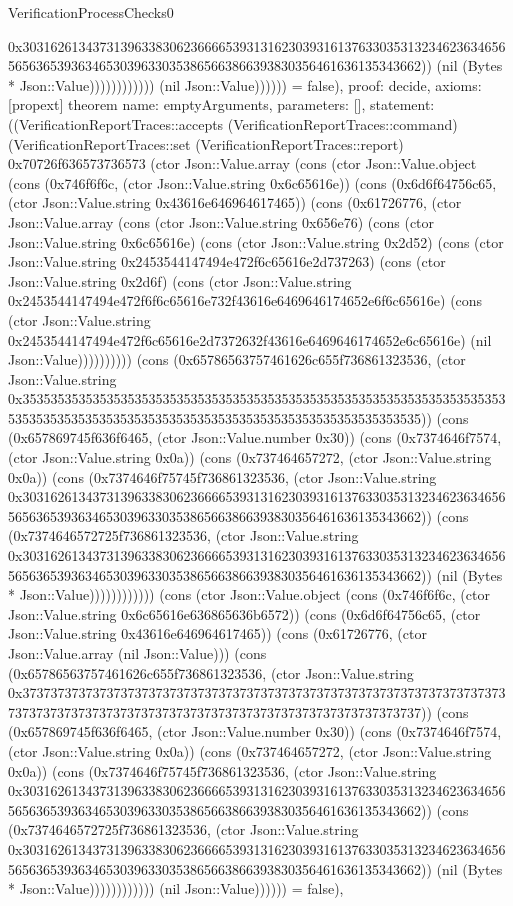 \begin{lexlean}{VerificationProcessChecks0}
\begin{semanticmodule}
{0x30316261343731396338306236666539313162303931613763303531323462363465656563653936346530396330353865663866393830356461636135343662)) (nil (Bytes * Json::Value)))))))))))) (nil Json::Value)))))) = false),
  proof: decide{},
  axioms: [propext]
}
theorem{
  name: emptyArguments,
  parameters: [],
  statement: ((VerificationReportTraces::accepts (VerificationReportTraces::command) (VerificationReportTraces::set (VerificationReportTraces::report) 0x70726f636573736573 (ctor Json::Value.array (cons (ctor Json::Value.object (cons (0x746f6f6c, (ctor Json::Value.string 0x6c65616e)) (cons (0x6d6f64756c65, (ctor Json::Value.string 0x43616e646964617465)) (cons (0x61726776, (ctor Json::Value.array (cons (ctor Json::Value.string 0x656e76) (cons (ctor Json::Value.string 0x6c65616e) (cons (ctor Json::Value.string 0x2d52) (cons (ctor Json::Value.string 0x2453544147494e472f6c65616e2d737263) (cons (ctor Json::Value.string 0x2d6f) (cons (ctor Json::Value.string 0x2453544147494e472f6f6c65616e732f43616e6469646174652e6f6c65616e) (cons (ctor Json::Value.string 0x2453544147494e472f6c65616e2d7372632f43616e6469646174652e6c65616e) (nil Json::Value)))))))))) (cons (0x65786563757461626c655f736861323536, (ctor Json::Value.string 0x35353535353535353535353535353535353535353535353535353535353535353535353535353535353535353535353535353535353535353535353535353535)) (cons (0x657869745f636f6465, (ctor Json::Value.number 0x30)) (cons (0x7374646f7574, (ctor Json::Value.string 0x0a)) (cons (0x737464657272, (ctor Json::Value.string 0x0a)) (cons (0x7374646f75745f736861323536, (ctor Json::Value.string 0x30316261343731396338306236666539313162303931613763303531323462363465656563653936346530396330353865663866393830356461636135343662)) (cons (0x7374646572725f736861323536, (ctor Json::Value.string 0x30316261343731396338306236666539313162303931613763303531323462363465656563653936346530396330353865663866393830356461636135343662)) (nil (Bytes * Json::Value)))))))))))) (cons (ctor Json::Value.object (cons (0x746f6f6c, (ctor Json::Value.string 0x6c65616e636865636b6572)) (cons (0x6d6f64756c65, (ctor Json::Value.string 0x43616e646964617465)) (cons (0x61726776, (ctor Json::Value.array (nil Json::Value))) (cons (0x65786563757461626c655f736861323536, (ctor Json::Value.string 0x37373737373737373737373737373737373737373737373737373737373737373737373737373737373737373737373737373737373737373737373737373737)) (cons (0x657869745f636f6465, (ctor Json::Value.number 0x30)) (cons (0x7374646f7574, (ctor Json::Value.string 0x0a)) (cons (0x737464657272, (ctor Json::Value.string 0x0a)) (cons (0x7374646f75745f736861323536, (ctor Json::Value.string 0x30316261343731396338306236666539313162303931613763303531323462363465656563653936346530396330353865663866393830356461636135343662)) (cons (0x7374646572725f736861323536, (ctor Json::Value.string 0x30316261343731396338306236666539313162303931613763303531323462363465656563653936346530396330353865663866393830356461636135343662)) (nil (Bytes * Json::Value)))))))))))) (nil Json::Value)))))) = false),
}
\end{semanticmodule}
\end{lexlean}
